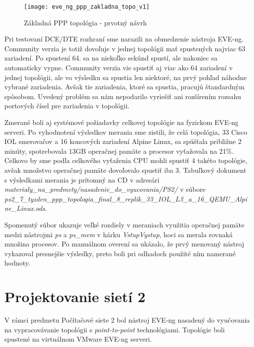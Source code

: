 \begin{figure}
    \centering
    \texttt{[image: eve\_ng\_ppp\_zakladna\_topo\_v1]}
    \caption{Základná PPP topológia - prvotný návrh}
    \label{obr:eve_ng_ppp_zakladna_topo_v1}
\end{figure}

Pri testovaní DCE/DTE rozhraní sme narazili na obmedzenie nástroja EVE-ng. Community verzia je totiž dovoľuje v jednej topológii mať spustených najviac 63 zariadení. Po spustení 64. sa na niekoľko sekúnd spustí, ale nakoniec sa automaticky vypne. Community verzia vie spustiť aj viac ako 64 zariadení v jednej topológii, ale vo výsledku sa spustia len niektoré, na prvý pohľad náhodne vybrané zariadenia. Avšak tie zariadenia, ktoré sa spustia, pracujú štandardným spôsobom. Uvedený problém sa nám nepodarilo vyriešiť ani rozšírením rozsahu portových čísel pre zariadenia v topológii.
  
Zmerané boli aj systémové požiadavky celkovej topológie na fyzickom EVE-ng serveri. Po vyhodnotení výsledkov merania sme zistili, že celá topológia, 33 Cisco IOL smerovačov a 16 koncových zariadení Alpine Linux, sa spúšťala približne 2 minúty, spotrebovala 13GB operačnej pamäte a procesor vyťažovala na 21\%. Celkovo by sme podľa celkového vyťaženia CPU mohli spustiť 4 takéto topológie, avšak množstvo operačnej pamäte dovoľovalo spustiť iba 3. Tabuľkový dokument s výsledkami merania je prítomný na CD v adresári \\ \emph{materialy\_na\_predmety/nasadenie\_do\_vyucovania/PS2/} v súbore \\ \emph{ps2\_7\_tyzden\_ppp\_topologia\_final\_8\_replik\_33\_IOL\_L3\_a\_16\_QEMU\_Alpine\_Linux.ods}.

Spomenutý súbor ukazuje veľké rozdiely v meraniach využitia operačnej pamäte medzi nástrojmi \emph{ps} a \emph{ps\_mem} v hárku \emph{VstupVystup}, hoci sa merala rovnaká množina procesov. Po manuálnom overení sa ukázalo, že prvý menovaný nástroj vykazoval presnejšie výsledky, preto boli pri odhadoch použité ním namerané hodnoty.





\section{Projektovanie sietí 2}

V rámci predmetu Počítačové siete 2 bol nástroj EVE-ng nasadený do vyučovania na vypracovávanie topológii s \emph{point-to-point} technológiami. Topológie boli spustené na virtuálnom VMware EVE-ng serveri.

